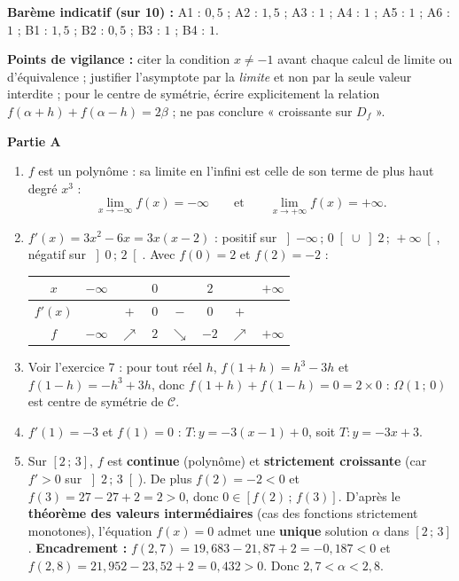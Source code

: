 \documentclass[11pt]{article}
\begin{document}
\begin{corrige}
\textbf{Barème indicatif (sur 10) :} A1 : $0{,}5$ ; A2 : $1{,}5$ ; A3 : $1$ ; A4 : $1$ ; A5 : $1$ ; A6 : $1$ ; B1 : $1{,}5$ ; B2 : $0{,}5$ ; B3 : $1$ ; B4 : $1$.

\textbf{Points de vigilance :} citer la condition $x\neq -1$ avant chaque calcul de limite ou d'équivalence ; justifier l'asymptote par la \emph{limite} et non par la seule valeur interdite ; pour le centre de symétrie, écrire explicitement la relation $f(\alpha+h)+f(\alpha-h)=2\beta$ ; ne pas conclure « croissante sur $D_f$ ».
\end{corrige}

\begin{corrige}
\textbf{Partie A}
\begin{enumerate}
\item $f$ est un polynôme : sa limite en l'infini est celle de son terme de plus haut degré $x^3$ :
\[ \lim_{x\to -\infty}f(x)=-\infty \qquad\text{et}\qquad \lim_{x\to +\infty}f(x)=+\infty. \]
\item $f'(x)=3x^2-6x=3x(x-2)$ : positif sur $\left]-\infty\,;\,0\right[\cup\left]2\,;\,+\infty\right[$, négatif sur $\left]0\,;\,2\right[$. Avec $f(0)=2$ et $f(2)=-2$ :
\begin{center}
\begin{tabular}{|c|ccccccc|}\hline
$x$ & $-\infty$ & & $0$ & & $2$ & & $+\infty$ \\ \hline
$f'(x)$ & & $+$ & $0$ & $-$ & $0$ & $+$ & \\ \hline
$f$ & $-\infty$ & $\nearrow$ & $2$ & $\searrow$ & $-2$ & $\nearrow$ & $+\infty$ \\ \hline
\end{tabular}
\end{center}
\item Voir l'exercice 7 : pour tout réel $h$, $f(1+h)=h^3-3h$ et $f(1-h)=-h^3+3h$, donc $f(1+h)+f(1-h)=0=2\times 0$ : $\boxed{\Omega(1\,;\,0)}$ est centre de symétrie de $\mathscr{C}$.
\item $f'(1)=-3$ et $f(1)=0$ : $T : y=-3(x-1)+0$, soit $\boxed{T : y=-3x+3}$.
\item Sur $[2\,;\,3]$, $f$ est \textbf{continue} (polynôme) et \textbf{strictement croissante} (car $f'>0$ sur $\left]2\,;\,3\right[$). De plus $f(2)=-2<0$ et $f(3)=27-27+2=2>0$, donc $0\in\left[f(2)\,;\,f(3)\right]$. D'après le \textbf{théorème des valeurs intermédiaires} (cas des fonctions strictement monotones), l'équation $f(x)=0$ admet une \textbf{unique} solution $\alpha$ dans $[2\,;\,3]$.
\textbf{Encadrement :} $f(2{,}7)=19{,}683-21{,}87+2=-0{,}187<0$ et $f(2{,}8)=21{,}952-23{,}52+2=0{,}432>0$. Donc $\boxed{2{,}7<\alpha<2{,}8}$.
\end{enumerate}


\end{corrige}
\end{document}
